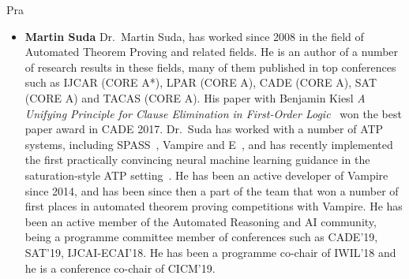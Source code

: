\begin{sitedescription}{Pra}
\begin{itemize}
\item \textbf{Martin Suda}
Dr.~Martin Suda, has worked since 2008 in the field of
Automated Theorem Proving and related fields.  He is an author of a number of research
results in these fields, many of them published in top conferences such
as IJCAR (CORE A*), LPAR (CORE A), CADE (CORE A), SAT (CORE A) and TACAS (CORE A).  His paper
with Benjamin Kiesl \emph{A Unifying Principle for Clause Elimination
  in First-Order Logic}~\cite{DBLP:conf/cade/Kiesl017} won the best
paper award in CADE 2017.
Dr.~Suda has worked with a number of ATP systems, including
SPASS~\cite{WeidenbachDFKSW09}, Vampire and E~\cite{Schulz13}, and has recently implemented the first practically convincing neural machine learning guidance in the saturation-style ATP setting~\cite{abs-1903-03182}. He has
been an active developer of Vampire since 2014, and has been since
then a part of the team that won a number of first places in automated
theorem proving competitions with Vampire.
He has been an active member of the Automated Reasoning and AI
community, being a programme committee member of conferences such as
CADE'19, SAT'19, IJCAI-ECAI'18. He has been a programme co-chair of IWIL'18 and he is a
conference co-chair of CICM'19.
\end{itemize}


\begin{itemize}
 

\end{itemize}
\end{sitedescription}
